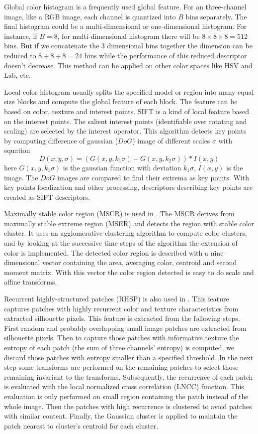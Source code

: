 Global color histogram is a frequently used global feature. For an three-channel image, like a RGB image, each channel is quantized into $B$ bins separately. The final histogram could be a multi-dimensional or one-dimensional histogram. For instance, if $B = 8$, for multi-dimensional histogram there will be  $8\times 8\times 8 = 512$ bins. But if we concatenate the 3 dimensional bins together the dimension can be reduced to $8 + 8 + 8 = 24$ bins while the performance of this reduced descriptor doesn't decrease. This method can be applied on other color spaces like HSV and Lab, etc.

Local color histogram usually splits the specified model or region into many equal size blocks and compute the global feature of each block. The feature can be based on color, texture and interest points. SIFT \cite{SIFT} is a kind of local feature based on the interest points. The salient interest points (identifiable over rotating and scaling) are selected by the interest operator. This algorithm detects key points by computing difference of gaussian ($DoG$) image of different scales $\sigma$ with equation
\begin{equation}
D(x,y,\sigma) = (G(x,y,k_1\sigma) - G(x,y,k_2\sigma))\ast I(x,y)
\end{equation}
here $G(x,y,k_1\sigma)$ is the gaussian function with deviation $k_1\sigma$, $I(x,y)$ is the image. The $DoG$ images are compared to find their extrema as key points. With key points localization and other processing, descriptors describing key points are created as SIFT descriptors.

Maximally stable color region (MSCR) is used in \cite{SDALF}. The MSCR derives from maximally stable extreme region (MSER) and detects the region with stable color cluster. It uses an agglomerative clustering algorithm to compute color clusters, and by looking at the successive time steps of the algorithm the extension of color is implemented. The detected color region is described with a nine dimensional vector containing the area, averaging color, centroid and second moment matrix. With this vector the color region detected is easy to do scale and affine transforms.

Recurrent highly-structured patches (RHSP) is also used in \cite{SDALF}. This feature captures patches with highly recurrent color and texture characteristics from extracted silhouette pixels. This feature is extracted from the following steps. First random and probably overlapping small image patches are extracted from silhouette pixels. Then to capture those patches with informative texture the entropy of each patch (the sum of three channels' entropy) is computed, we discard those patches with entropy smaller than a specified threshold. In the next step some transforms are performed on the remaining patches to select those remaining invariant to the transforms. Subsequently, the recurrence of each patch is evaluated with the local normalized cross correlation (LNCC) function. This evaluation is only performed on small region containing the patch instead of the whole image. Then the patches with high recurrence is clustered to avoid patches with similar content. Finally, the Gaussian cluster is applied to maintain the patch nearest to cluster's centroid for each cluster.

